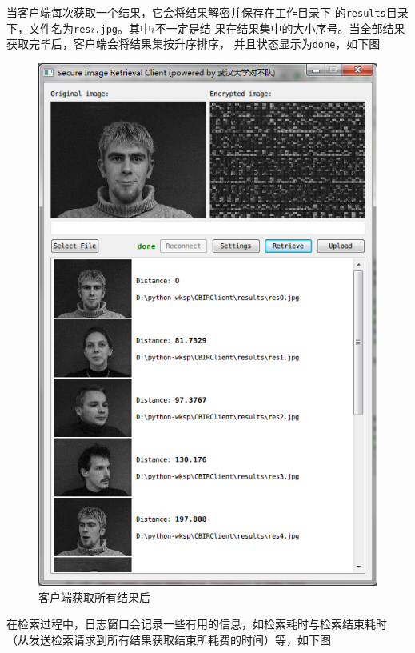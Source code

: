 当客户端每次获取一个结果，它会将结果解密并保存在工作目录下
的\texttt{results}目录下，文件名为\texttt{res$i$.jpg}。其中$i$不一定是结
果在结果集中的大小序号。当全部结果获取完毕后，客户端会将结果集按升序排序，
并且状态显示为\texttt{done}，如下图

\begin{figure}[H]
  \centering
  \includegraphics[keepaspectratio=true]{images/ui-retrieve-done.png}
  \caption{客户端获取所有结果后}
  \label{fig:ui-retrieve-done}
\end{figure}

在检索过程中，日志窗口会记录一些有用的信息，如检索耗时与检索结束耗时
（从发送检索请求到所有结果获取结束所耗费的时间）等，如下图


